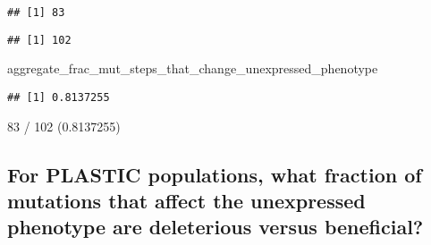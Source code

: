 \documentclass[]{book}
\newenvironment{Shaded}{\begin{snugshade}}{\end{snugshade}}
\newcommand{\KeywordTok}[1]{\textcolor[rgb]{0.13,0.29,0.53}{\textbf{#1}}}
\newcommand{\NormalTok}[1]{#1}
\newcommand{\OperatorTok}[1]{\textcolor[rgb]{0.81,0.36,0.00}{\textbf{#1}}}
\newcommand{\StringTok}[1]{\textcolor[rgb]{0.31,0.60,0.02}{#1}}
\begin{document}
\begin{verbatim}
## [1] 83
\end{verbatim}

\begin{Shaded}
\end{Shaded}

\begin{verbatim}
## [1] 102
\end{verbatim}

\begin{Shaded}
\begin{Highlighting}[]
\NormalTok{aggregate_frac_mut_steps_that_change_unexpressed_phenotype}
\end{Highlighting}
\end{Shaded}

\begin{verbatim}
## [1] 0.8137255
\end{verbatim}

83 / 102 (0.8137255)

\hypertarget{for-plastic-populations-what-fraction-of-mutations-that-affect-the-unexpressed-phenotype-are-deleterious-versus-beneficial}{%
\subsection{For PLASTIC populations, what fraction of mutations that affect the unexpressed phenotype are deleterious versus beneficial?}\label{for-plastic-populations-what-fraction-of-mutations-that-affect-the-unexpressed-phenotype-are-deleterious-versus-beneficial}}

\begin{Shaded}
\end{Shaded}
\end{document}
